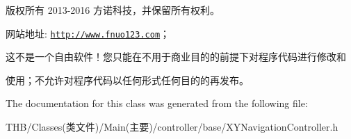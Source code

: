 版权所有 2013-\/2016 方诺科技，并保留所有权利。

网站地址\+: \href{http://www.fnuo123.com}{\tt http\+://www.\+fnuo123.\+com}； 



这不是一个自由软件！您只能在不用于商业目的的前提下对程序代码进行修改和

使用；不允许对程序代码以任何形式任何目的的再发布。 

 

The documentation for this class was generated from the following file\+:\begin{DoxyCompactItemize}
\item 
T\+H\+B/\+Classes(类文件)/\+Main(主要)/controller/base/X\+Y\+Navigation\+Controller.\+h\end{DoxyCompactItemize}
